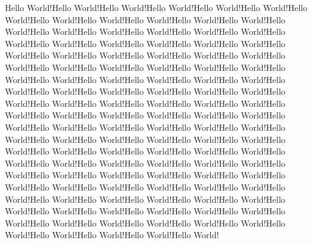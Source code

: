 \documentclass{minimal}
\begin{document}
Hello World!Hello World!Hello World!Hello World!Hello World!Hello
World!Hello World!Hello World!Hello World!Hello World!Hello World!Hello
World!Hello World!Hello World!Hello World!Hello World!Hello World!Hello
World!Hello World!Hello World!Hello World!Hello World!Hello World!Hello
World!Hello World!Hello World!Hello World!Hello World!Hello World!Hello
World!Hello World!Hello World!Hello World!Hello World!Hello World!Hello
World!Hello World!Hello World!Hello World!Hello World!Hello World!Hello
World!Hello World!Hello World!Hello World!Hello World!Hello World!Hello
World!Hello World!Hello World!Hello World!Hello World!Hello World!Hello
World!Hello World!Hello World!Hello World!Hello World!Hello World!Hello
World!Hello World!Hello World!Hello World!Hello World!Hello World!Hello
World!Hello World!Hello World!Hello World!Hello World!Hello World!Hello
World!Hello World!Hello World!Hello World!Hello World!Hello World!Hello
World!Hello World!Hello World!Hello World!Hello World!Hello World!Hello
World!Hello World!Hello World!Hello World!Hello World!Hello World!Hello
World!Hello World!Hello World!Hello World!Hello World!Hello World!Hello
World!Hello World!Hello World!Hello World!Hello World!Hello World!Hello
World!Hello World!Hello World!Hello World!Hello World!Hello World!Hello
World!Hello World!Hello World!Hello World!Hello World!Hello World!Hello
World!Hello World!Hello World!Hello World!Hello World!Hello World!
\end{document}
